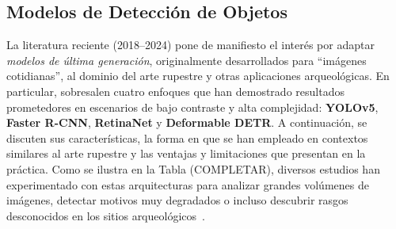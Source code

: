 \subsection{Modelos de Detección de Objetos}

La literatura reciente (2018–2024) pone de manifiesto el interés por adaptar \emph{modelos de última generación}, originalmente desarrollados para “imágenes cotidianas”, al dominio del arte rupestre y otras aplicaciones arqueológicas. En particular, sobresalen cuatro enfoques que han demostrado resultados prometedores en escenarios de bajo contraste y alta complejidad: \textbf{YOLOv5}, \textbf{Faster R-CNN}, \textbf{RetinaNet} y \textbf{Deformable DETR}. A continuación, se discuten sus características, la forma en que se han empleado en contextos similares al arte rupestre y las ventajas y limitaciones que presentan en la práctica. Como se ilustra en la Tabla (COMPLETAR), diversos estudios han experimentado con estas arquitecturas para analizar grandes volúmenes de imágenes, detectar motivos muy degradados o incluso descubrir rasgos desconocidos en los sitios arqueológicos~\cite{horn2022,jalandoni2022,suhaimi2023}.

